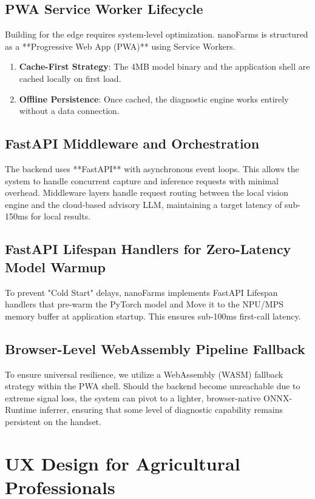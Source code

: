 \documentclass[11pt,onecolumn]{article}
\begin{document}
\subsection{PWA Service Worker Lifecycle}
Building for the edge requires system-level optimization. nanoFarms is structured as a **Progressive Web App (PWA)** using Service Workers.
\begin{enumerate}
    \item \textbf{Cache-First Strategy}: The 4MB model binary and the application shell are cached locally on first load.
    \item \textbf{Offline Persistence}: Once cached, the diagnostic engine works entirely without a data connection.
\end{enumerate}

\subsection{FastAPI Middleware and Orchestration}
The backend uses **FastAPI** with asynchronous event loops. This allows the system to handle concurrent capture and inference requests with minimal overhead. Middleware layers handle request routing between the local vision engine and the cloud-based advisory LLM, maintaining a target latency of sub-150ms for local results.

\subsection{FastAPI Lifespan Handlers for Zero-Latency Model Warmup}
To prevent "Cold Start" delays, nanoFarms implements FastAPI Lifespan handlers that pre-warm the PyTorch model and Move it to the NPU/MPS memory buffer at application startup. This ensures sub-100ms first-call latency.

\subsection{Browser-Level WebAssembly Pipeline Fallback}
To ensure universal resilience, we utilize a WebAssembly (WASM) fallback strategy within the PWA shell. Should the backend become unreachable due to extreme signal loss, the system can pivot to a lighter, browser-native ONNX-Runtime inferrer, ensuring that some level of diagnostic capability remains persistent on the handset.

\section{UX Design for Agricultural Professionals}
\end{document}
